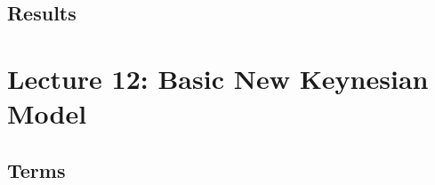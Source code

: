 \documentclass[10pt]{article}
\begin{document}

\subsection{Results}



\section{Lecture 12: Basic New Keynesian Model}

\subsection{Terms}
\end{document}
